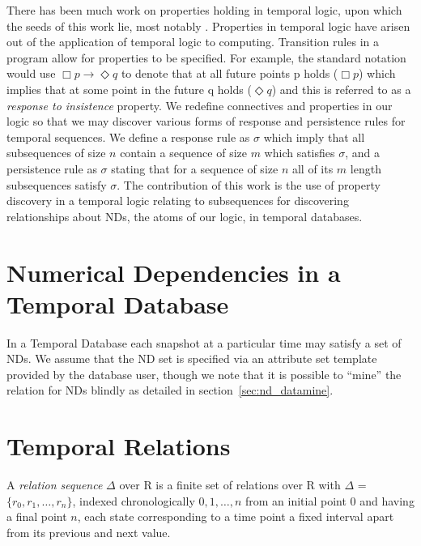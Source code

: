 There has been much work on properties holding in temporal logic, upon
which the seeds of this work lie, most notably \cite{mp92}. Properties
in temporal logic have arisen out of the application of temporal logic
to computing. Transition rules in a program allow for properties to be
specified. For example, the standard notation would use $\Box p \to
\Diamond q$ to denote that at all future points p holds ($\Box p$)
which implies
that at some point in the future q holds ($\Diamond q$) and this is
referred to as a
{\em response to insistence} property. We redefine connectives and
properties in
our logic so that we may discover various forms of response and
persistence rules for temporal sequences. We define a response rule as
 $\sigma$ which imply that all subsequences
of size $n$ contain a sequence of size $m$ which satisfies $\sigma$, and a
persistence rule as  $\sigma$  
stating that for a sequence of size $n$ all of its $m$ length subsequences
satisfy $\sigma$.
The contribution of this work is the use of property discovery in a
temporal logic relating to subsequences for discovering relationships
about NDs, the atoms of our logic, in temporal databases.
	
\section{Numerical Dependencies in a Temporal Database}\label{sec:tl_nd}

In a Temporal Database each snapshot at a particular time may satisfy
a set of NDs. We assume that the ND set is specified via an attribute
set template provided by the database user, though we note that it is
possible to ``mine'' the relation for NDs blindly as detailed in section~\ref{sec:nd_datamine}.


\section{Temporal Relations}\label{sec:tl_relations}


\begin{definition}
\begin{rm}
A {\em relation sequence} $\Delta$ over R is a finite set of
relations over R with $\Delta$ = $\{ r_0, r_1, \ldots, r_n \}$,
indexed chronologically $0, 1, \ldots, n$ from an initial point 0 and
having a final point $n$, each state corresponding to a time point a
fixed interval apart from its previous and next value.
\end{rm}
\end{definition}

